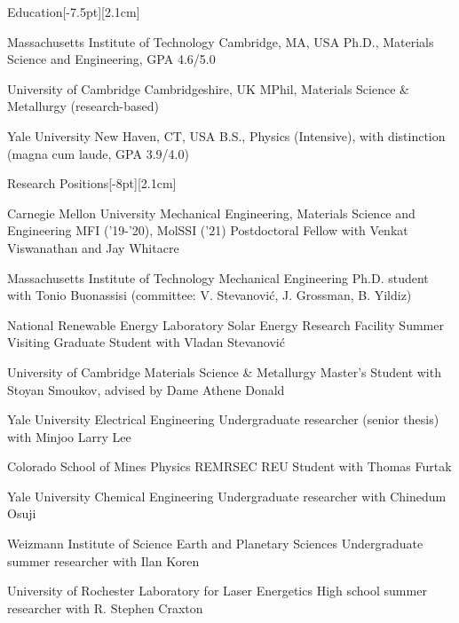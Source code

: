 \documentclass{cv} %
\begin{document}
\thispagestyle{empty}
\begin{cvSection}{Education}[-7.5pt][2.1cm]

     {Massachusetts Institute of Technology}
     {Cambridge, MA, USA}
     {Ph.D., Materials Science and Engineering, GPA 4.6/5.0}

     {University of Cambridge}
     {Cambridgeshire, UK}
     {MPhil, Materials Science \& Metallurgy (research-based)}

     {Yale University}
     {New Haven, CT, USA}
     {B.S., Physics (Intensive), with distinction (magna cum laude, GPA 3.9/4.0)}


\end{cvSection}

\begin{cvSection}{Research Positions}[-8pt][2.1cm]

    {Carnegie Mellon University}
    {Mechanical Engineering, Materials Science and Engineering}
    {MFI ('19-'20), MolSSI ('21) Postdoctoral Fellow with Venkat Viswanathan and Jay Whitacre}

    {Massachusetts Institute of Technology}
    {Mechanical Engineering}
    {Ph.D. student with Tonio Buonassisi (committee: V. Stevanovi\'c, J. Grossman, B. Yildiz)}

    {National Renewable Energy Laboratory}
    {Solar Energy Research Facility}
    {Summer Visiting Graduate Student with Vladan Stevanovi\'c}

    {University of Cambridge}
    {Materials Science \& Metallurgy}
    {Master's Student with Stoyan Smoukov, advised by Dame Athene Donald}

    {Yale University}
    {Electrical Engineering}
    {Undergraduate researcher (senior thesis) with Minjoo Larry Lee}

    {Colorado School of Mines}
    {Physics}
    {REMRSEC REU Student with Thomas Furtak}

    {Yale University}
    {Chemical Engineering}
    {Undergraduate researcher with Chinedum Osuji}

    {Weizmann Institute of Science}
    {Earth and Planetary Sciences}
    {Undergraduate summer researcher with Ilan Koren}

    {University of Rochester}
    {Laboratory for Laser Energetics}
    {High school summer researcher with R. Stephen Craxton}

\end{cvSection}
\end{document}
